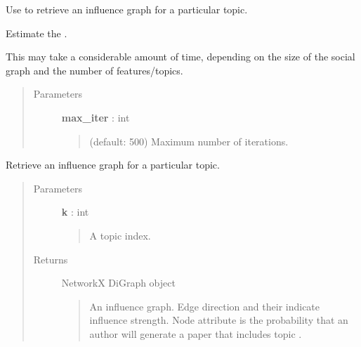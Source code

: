 \documentclass[letterpaper,10pt,english]{sphinxmanual}
\begin{document}
\begin{fulllineitems}
Use {\hyperref[tethne.model.social.tapmodel:tethne.model.social.tapmodel.TAPModel.graph]{}} to retrieve an influence graph for a particular
topic.

\begin{fulllineitems}
\label{tethne.model.social.tapmodel:tethne.model.social.tapmodel.TAPModel.build}
Estimate the {\hyperref[tethne.model.social.tapmodel:tethne.model.social.tapmodel.TAPModel]{}}.

This may take a considerable amount of time, depending on the size of
the social graph and the number of features/topics.
\begin{quote}\begin{description}
\item[{Parameters}] \leavevmode
\textbf{max\_iter} : int
\begin{quote}

(default: 500) Maximum number of iterations.
\end{quote}

\end{description}\end{quote}

\end{fulllineitems}


\begin{fulllineitems}
\label{tethne.model.social.tapmodel:tethne.model.social.tapmodel.TAPModel.graph}
Retrieve an influence graph for a particular topic.
\begin{quote}\begin{description}
\item[{Parameters}] \leavevmode
\textbf{k} : int
\begin{quote}

A topic index.
\end{quote}

\item[{Returns}] \leavevmode
NetworkX DiGraph object
\begin{quote}

An influence graph. Edge direction and their  indicate
influence strength. Node attribute  is the probability
that an author will generate a paper that includes topic .
\end{quote}


\end{description}
\end{quote}
\end{fulllineitems}
\end{fulllineitems}
\end{document}
